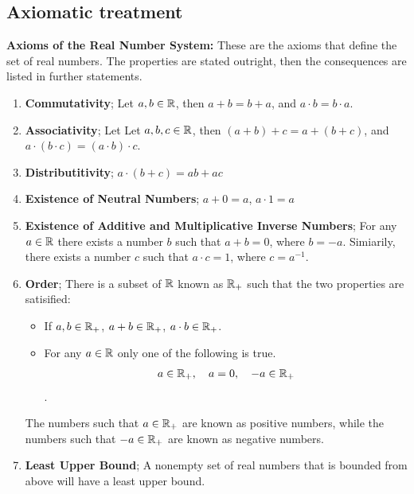 \subsection{Axiomatic treatment}

\begin{theorem}
    \label{thm:realnumber}
    \textbf{Axioms of the Real Number System:} These are the axioms that define the set of real numbers. The properties are stated outright, then the consequences are listed in further statements.
   
    \begin{enumerate}[label=F\arabic{*}:]
        \item \textbf{Commutativity}; Let $a, b \in \mathbb{R}$, then $a + b = b + a$, and $a \cdot b = b \cdot a$. 
        \item \textbf{Associativity}; Let Let $a, b, c \in \mathbb{R}$, then $(a + b) + c = a + (b + c)$, and $a \cdot (b \cdot c) = (a\cdot b) \cdot c$.
        \item \textbf{Distributitivity}; $a \cdot (b + c) = ab + ac$
        \item \textbf{Existence of Neutral Numbers}; $a + 0 = a$, $a \cdot 1 = a$
        \item \textbf{Existence of Additive and Multiplicative Inverse Numbers}; For any $a 
         \in \mathbb{R}$ there exists a number $b$ such that $a + b = 0$, where $b = -a$. Simiarily, there exists a number $c$ such that $a \cdot c = 1$, where $c = a^{-1}$.
    \end{enumerate}
    \begin{enumerate}[label=O\arabic{*}:]
        \setcounter{enumi}{5}
        \item \textbf{Order}; There is a subset of $\mathbb{R}$ known as $\mathbb{R}_+$ such that the two properties are satisified:
        \begin{itemize}
            \item If $a, b \in \mathbb{R}_+$, $a + b \in \mathbb{R}_+$, $a \cdot b \in \mathbb{R}_+$. 
            \item For any $a \in \mathbb{R}$ only one of the following is true. \[a\in \mathbb{R}_+,\quad a = 0,\quad -a \in \mathbb{R}_+\]. 
        \end{itemize}
        The numbers such that $a \in \mathbb{R}_+$ are known as positive numbers, while the numbers such that $-a \in \mathbb{R}_+$ are known as negative numbers. 
    \end{enumerate}
    \begin{enumerate}[label=LUB\arabic{*}:]
        \setcounter{enumi}{6}
        \item \textbf{Least Upper Bound}; A nonempty set of real numbers that is bounded from above will have a least upper bound. 
    \end{enumerate}
\end{theorem}

